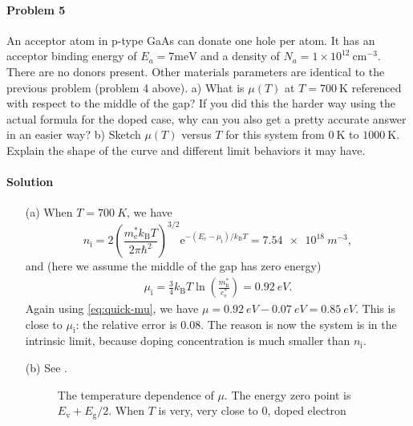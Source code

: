 \documentclass[hyperref, a4paper]{article}
\newcommand*{\ee}{\mathrm{e}}
\begin{document}
\paragraph{Problem 5} An acceptor atom in p-type GaAs can donate one hole per atom. It has an acceptor binding energy of $E_a=7 \mathrm{meV}$ and a density of $N_a=1 \times 10^{12} \mathrm{~cm}^{-3}$. There are no donors present. Other materials parameters are identical to the previous problem (problem 4 above).
a) What is $\mu(T)$ at $T=700 \mathrm{~K}$ referenced with respect to the middle of the gap? If you did this the harder way using the actual formula for the doped case, why can you also get a pretty accurate answer in an easier way?
b) Sketch $\mu(T)$ versus $T$ for this system from $0 \mathrm{~K}$ to $1000 \mathrm{~K}$. Explain the shape of the curve and different limit behaviors it may have.

\paragraph{Solution} \begin{itemize}
\item[(a)] When $T = \SI{700}{K}$, we have 
\begin{equation}
    n_{\text{i}} = 2 \left( \frac{m_\text{e}^* k_{\text{B}} T}{2 \pi \hbar^2} \right)^{3/2} 
    \ee^{- (E_{\text{c}} - \mu_{\text{i}}) / k_{\text{B}} T} 
    = \SI{7.54e18}{m^{-3}},
\end{equation}
and (here we assume the middle of the gap has zero energy)
\begin{eqnarray}
    \mu_{\text{i}} = \frac{3}{4} k_{\text{B}} T \ln(\frac{m^*_{\text{h}} }{e^*_{\text{e}}}) = \SI{0.92}{eV}.
\end{eqnarray}
Again using \eqref{eq:quick-mu}, we have $\mu = \SI{0.92}{eV} - \SI{0.07}{eV} = \SI{0.85}{eV}$.
This is close to $\mu_{\text{i}}$: the relative error is 0.08.
The reason is now the system is in the intrinsic limit, 
because doping concentration is much smaller than $n_{\text{i}}$.

\item[(b)] See .

\begin{figure}
    \centering
    
    \caption{The temperature dependence of $\mu$. 
    The energy zero point is $E_{\text{v}} + E_{\text{g}} / 2$.
    When $T$ is very, very close to 0, doped electron }
    \label{fig:semiconductor-limits}
\end{figure}

\end{itemize}
\end{document}
